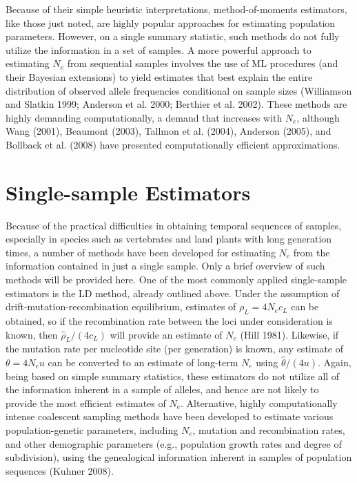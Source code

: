 \documentclass{article}
\begin{document}
Because of their simple heuristic interpretations, method-of-moments estimators, like those just noted, are highly popular approaches for estimating population parameters. However, on a single summary statistic, such methods do not fully utilize the information in a set of samples. A more powerful approach to estimating  $ N_{e} $ from sequential samples involves the use of ML procedures (and their Bayesian extensions) to yield estimates that best explain the entire distribution of observed allele frequencies conditional on sample sizes (Williamson and Slatkin 1999; Anderson et al. 2000; Berthier et al. 2002). These methods are highly demanding computationally, a demand that increases with  $ N_{e} $, although Wang (2001), Beaumont (2003), Tallmon et al. (2004), Anderson (2005), and Bollback et al. (2008) have presented computationally efficient approximations.

\section{Single-sample Estimators}
Because of the practical difficulties in obtaining temporal sequences of samples, especially in species such as vertebrates and land plants with long generation times, a number of methods have been developed for estimating  $ N_e $ from the information contained in just a single sample. Only a brief overview of such methods will be provided here. One of the most commonly applied single-sample estimators is the LD method, already outlined above. Under the assumption of drift-mutation-recombination equilibrium, estimates of  $ \rho_L = 4N_e c_L $ can be obtained, so if the recombination rate between the loci under consideration is known, then  $ \widehat{\rho}_L / (4c_L) $ will provide an estimate of  $ N_e $ (Hill 1981). Likewise, if the mutation rate per nucleotide site (per generation) is known, any estimate of  $ \theta = 4N_e u $ can be converted to an estimate of long-term  $ N_e $ using  $ \widehat{\theta} / (4u) $. Again, being based on simple summary statistics, these estimators do not utilize all of the information inherent in a sample of alleles, and hence are not likely to provide the most efficient estimates of  $ N_e $. Alternative, highly computationally intense coalescent sampling methods have been developed to estimate various population-genetic parameters, including  $ N_e $, mutation and recombination rates, and other demographic parameters (e.g., population growth rates and degree of subdivision), using the genealogical information inherent in samples of population sequences (Kuhner 2008).
\end{document}

